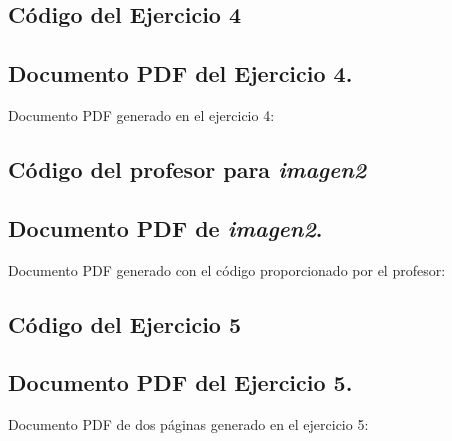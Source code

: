 \documentclass[a4paper]{article}
\begin{document}
\subsection{Código del Ejercicio 4} \label{anexo:ej4} 


\subsection{Documento PDF del Ejercicio 4.} \label{anexo:pdf4}
Documento PDF generado en el ejercicio 4:


\subsection{Código del profesor para \textit{imagen2}} \label{anexo:imagen2} 


\subsection{Documento PDF de \textit{imagen2}.} \label{anexo:pdfi2}
Documento PDF generado con el código proporcionado por el profesor:


\subsection{Código del Ejercicio 5} \label{anexo:ej5} 


\subsection{Documento PDF del Ejercicio 5.} \label{anexo:pdf5}
Documento PDF de dos páginas generado en el ejercicio 5:


\end{document}
